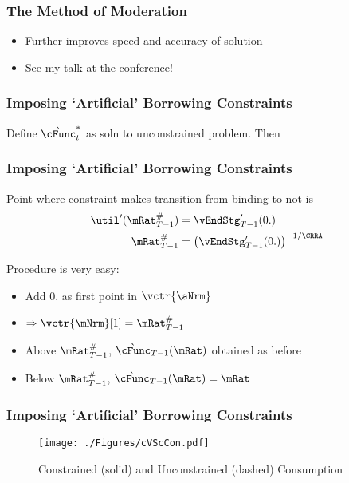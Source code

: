 \documentclass{beamer}
\begin{document}
\begin{frame}[label=MoM]
\frametitle{The Method of Moderation}

\begin{itemize}
\item Further improves speed and accuracy of solution
\item See my talk at the conference!
\end{itemize}

\end{frame}

\begin{frame}
\frametitle{Imposing `Artificial' Borrowing Constraints}


\pause 

Define $\grave{\cFunc}^{*}_{t}$ as soln to unconstrained problem.  Then


\end{frame}

\begin{frame}
\frametitle{Imposing `Artificial' Borrowing Constraints}

Point where constraint makes transition from binding to not is
\begin{equation*}\begin{gathered}\begin{aligned}
    \util^{\prime}(\mRat_{T-1}^{\#})  & = \vEndStg^{\prime}_{T-1}(0.)
\\  \mRat_{T-1}^{\#}  & = \left(\vEndStg^{\prime}_{T-1}(0.)\right)^{-1/\CRRA}
\end{aligned}\end{gathered}\end{equation*}
\pause\medskip

Procedure is very easy:
\begin{itemize}
\item Add $0.$ as first point in $\vctr{\aNrm}$
\item $\Rightarrow \vctr{\mNrm}[1] = \mRat_{T-1}^{\#}$
\item Above $\mRat_{T-1}^{\#}$, $\grave{\cFunc}_{T-1}(\mRat)$ obtained as before
\item Below $\mRat_{T-1}^{\#}$, $\grave{\cFunc}_{T-1}(\mRat)=\mRat$
\end{itemize}

\end{frame}

\begin{frame}
\frametitle{Imposing `Artificial' Borrowing Constraints}
\begin{figure}
\texttt{[image: ./Figures/cVScCon.pdf]}
        \caption{Constrained (solid) and Unconstrained (dashed) Consumption}
        \label{fig:cVScCon}
\end{figure}

\end{frame}
\end{document}
